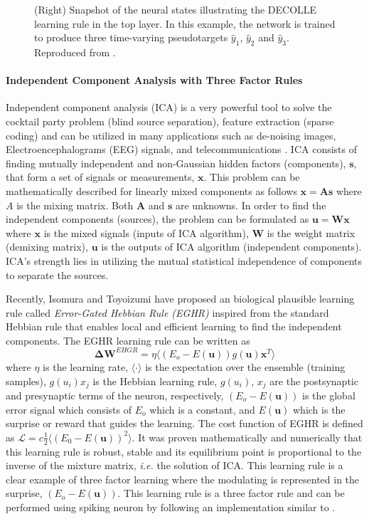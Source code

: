 \documentclass[english]{article}
\renewcommand{\cite}{\citep}
\begin{document}
\begin{figure}
{  (Right) Snapshot of the neural states illustrating the DECOLLE learning rule in the top layer. In this example, the network is trained to produce three time-varying pseudotargets $\hat{y}_1$, $\hat{y}_2$ and $\hat{y}_3$. Reproduced from \cite{Kaiser_etal18_synaplas}}.
\end{figure}
%

\paragraph{Independent Component Analysis with Three Factor Rules }
Independent component analysis (ICA) is a very powerful tool to solve the cocktail party problem (blind source separation), feature extraction (sparse coding) and can be utilized in many applications such as de-noising images, Electroencephalograms (EEG) signals, and telecommunications \cite{hyvarinen2004independent}. ICA consists of finding mutually independent and non-Gaussian hidden factors (components), $\mathbf{s}$, that form a set of signals or measurements, $\mathbf{x}$. This problem can be mathematically described for linearly mixed components as follows  
$\mathbf{x}=\mathbf{A}\mathbf{s}$ where $A$ is the mixing matrix. Both $\mathbf{A}$ and $\mathbf{s}$ are unknowns. {In order to find the independent components (sources), the problem can be formulated as $\mathbf{u}=\mathbf{W}\mathbf{x}$ where $\mathbf{x}$ is the mixed signals (inputs of ICA algorithm), $\mathbf{W}$ is the weight matrix (demixing matrix), $\mathbf{u}$ is the outputs of ICA algorithm (independent components).} ICA's strength lies in  utilizing the mutual statistical independence of components to separate the sources. 

Recently, Isomura and Toyoizumi have proposed an biological plausible learning rule called \textit{Error-Gated Hebbian Rule (EGHR)} inspired from the standard Hebbian rule \cite{isomura2016local} that enables local and efficient learning to find the independent components. The EGHR learning rule can be written as 
\begin{equation}
\mathbf{\Delta{W}}^{EHGR}=\eta \langle\left(E_o-E(\mathbf{u})\right)g(\mathbf{u})\mathbf{x}^T\rangle
\end{equation}
\noindent where $\eta$ is the learning rate, $\langle\cdot\rangle$ is the expectation over the ensemble (training samples), $g(u_i)x_j$ is the Hebbian learning rule, $g(u_i)$, $x_j$ are the postsynaptic and presynaptic terms of the neuron, respectively, $(E_o-E(\mathbf{u}))$ is the global error signal which consists of $E_o$ which is a constant, and $E(\mathbf{u})$ which is the surprise or reward that guides the learning. The cost function of EGHR is defined as $\mathcal{L}=c\frac12\langle(E_0-E(\mathbf{u}))^2\rangle$. It was proven mathematically and numerically that this learning rule is robust, stable and its equilibrium point is proportional to the inverse of the mixture matrix, \emph{i.e.} the solution of ICA. This learning rule is a clear example of three factor learning where the modulating is represented in the surprise,  $\left(E_o-E(\mathbf{u})\right)$. 
This learning rule is a three factor rule and can be performed using spiking neuron by following an implementation similar to  \cite{savin2010independent}.
\end{document}
